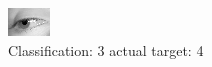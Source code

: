 \begin{figure}[h!]
\begin{center}
\includegraphics[width=0.60\columnwidth]{figures/ID3026_class_3_target_4.png}
\end{center}
\caption{ Classification: 3 actual target: 4}
\label{fig:ID3026_class_3_target_4}
\end{figure}
